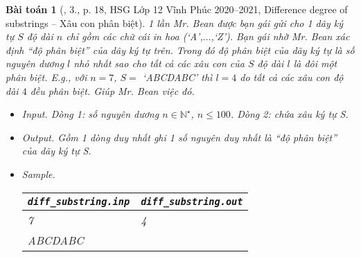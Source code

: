 \documentclass{article}
\newtheorem{baitoan}{Bài toán}
\begin{document}
\begin{baitoan}[\cite{Trung_HSG_THPT_Tin}, 3., p. 18, HSG Lớp 12 Vĩnh Phúc 2020--2021, Difference degree of substrings -- Xâu con phân biệt]
	1 lần Mr. Bean được bạn gái gửi cho 1 dãy ký tự $S$ độ dài $n$ chỉ gồm các chữ cái in hoa (`A',$\ldots$,`Z'). Bạn gái nhờ Mr. Bean xác định ``độ phân biệt'' của dãy ký tự trên. Trong đó {\rm độ phân biệt} của dãy ký tự là số nguyên dương $l$ nhỏ nhất sao cho tất cả các xâu con của $S$ độ dài $l$ là đôi một phân biệt. E.g., với $n = 7$, $S =$ `ABCDABC' thì $l = 4$ do tất cả các xâu con độ dài $4$ đều phân biệt. Giúp Mr. Bean việc đó.
	\begin{itemize}
		\item {\sf Input.} Dòng 1: số nguyên dương $n\in\mathbb{N}^\star$, $n\le100$. Dòng 2: chứa xâu ký tự S.
		\item {\sf Output.} Gồm 1 dòng duy nhất ghi 1 số nguyên duy nhất là ``độ phân biệt'' của dãy ký tự S.
		\item {\sf Sample.}
		\begin{table}[H]
			\centering
			\begin{tabular}{|l|l|}
				\hline
				\verb|diff_substring.inp| & \verb|diff_substring.out| \\
				\hline
				7 & 4 \\
				ABCDABC &  \\
				\hline
			\end{tabular}
		\end{table}
	\end{itemize}
\end{baitoan}
\end{document}
